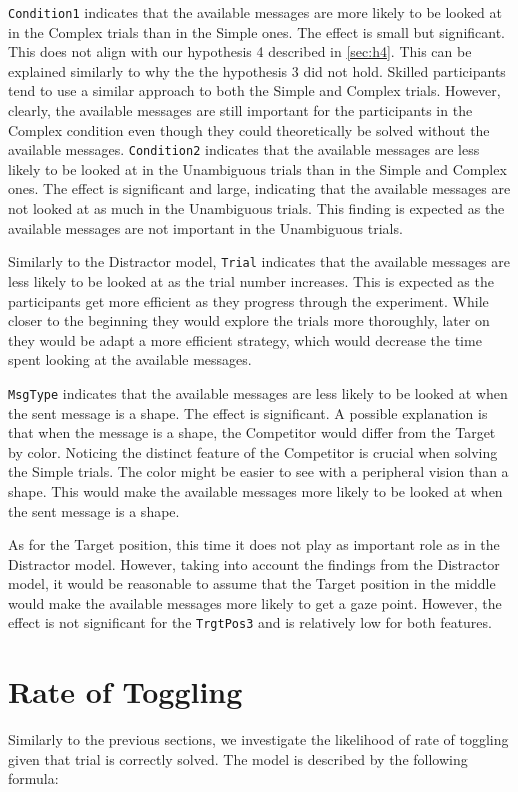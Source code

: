 \texttt{Condition1} indicates that the available messages are more likely to be looked at in the Complex trials than in the Simple ones. The effect is small but significant. This does not align with our hypothesis 4 described in \autoref{sec:h4}. This can be explained similarly to why the the hypothesis 3 did not hold. Skilled participants tend to use a similar approach to both the Simple and Complex trials. However, clearly, the available messages are still important for the participants in the Complex condition even though they could theoretically be solved without the available messages. \texttt{Condition2} indicates that the available messages are less likely to be looked at in the Unambiguous trials than in the Simple and Complex ones. The effect is significant and large, indicating that the available messages are not looked at as much in the Unambiguous trials. This finding is expected as the available messages are not important in the Unambiguous trials.

Similarly to the Distractor model, \texttt{Trial} indicates that the available messages are less likely to be looked at as the trial number increases. This is expected as the participants get more efficient as they progress through the experiment. While closer to the beginning they would explore the trials more thoroughly, later on they would be adapt a more efficient strategy, which would decrease the time spent looking at the available messages.

\texttt{MsgType} indicates that the available messages are less likely to be looked at when the sent message is a shape. The effect is significant. A possible explanation is that when the message is a shape, the Competitor would differ from the Target by color. Noticing the distinct feature of the Competitor is crucial when solving the Simple trials. The color might be easier to see with a peripheral vision than a shape. This would make the available messages more likely to be looked at when the sent message is a shape.

As for the Target position, this time it does not play as important role as in the Distractor model. However, taking into account the findings from the Distractor model, it would be reasonable to assume that the Target position in the middle would make the available messages more likely to get a gaze point. However, the effect is not significant for the \texttt{TrgtPos3} and is relatively low for both features. 




\section{Rate of Toggling}
\label{sec:rate_toggling}
Similarly to the previous sections, we investigate the likelihood of rate of toggling given that trial is correctly solved. The model is described by the following formula:


